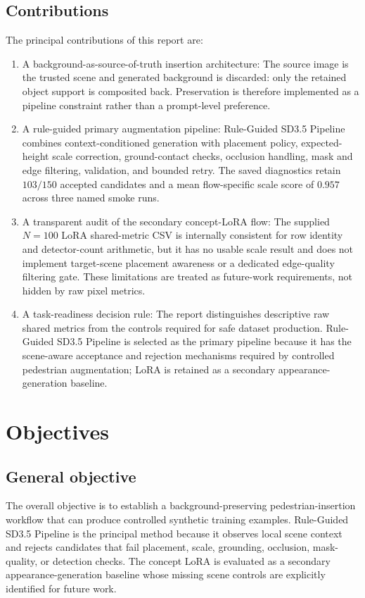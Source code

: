 \documentclass[11pt,a4paper]{article}
\begin{document}
\subsection*{Contributions}
The principal contributions of this report are:
\begin{enumerate}[leftmargin=1.6em,itemsep=3pt]
  \item A background-as-source-of-truth insertion architecture: The source image is the trusted scene and generated background is discarded: only the retained object support is composited back. Preservation is therefore implemented as a pipeline constraint rather than a prompt-level preference.
  \item A rule-guided primary augmentation pipeline: Rule-Guided SD3.5 Pipeline combines context-conditioned generation with placement policy, expected-height scale correction, ground-contact checks, occlusion handling, mask and edge filtering, validation, and bounded retry. The saved diagnostics retain $103/150$ accepted candidates and a mean flow-specific scale score of $0.957$ across three named smoke runs.
  \item A transparent audit of the secondary concept-LoRA flow: The supplied $N=100$ LoRA shared-metric CSV is internally consistent for row identity and detector-count arithmetic, but it has no usable scale result and does not implement target-scene placement awareness or a dedicated edge-quality filtering gate. These limitations are treated as future-work requirements, not hidden by raw pixel metrics.
  \item A task-readiness decision rule: The report distinguishes descriptive raw shared metrics from the controls required for safe dataset production. Rule-Guided SD3.5 Pipeline is selected as the primary pipeline because it has the scene-aware acceptance and rejection mechanisms required by controlled pedestrian augmentation; LoRA is retained as a secondary appearance-generation baseline.
\end{enumerate}
\section{Objectives}\label{sec:objectives}

\subsection*{General objective}
The overall objective is to establish a background-preserving pedestrian-insertion workflow that can produce controlled synthetic training examples. Rule-Guided SD3.5 Pipeline is the principal method because it observes local scene context and rejects candidates that fail placement, scale, grounding, occlusion, mask-quality, or detection checks. The concept LoRA is evaluated as a secondary appearance-generation baseline whose missing scene controls are explicitly identified for future work.
\end{document}
